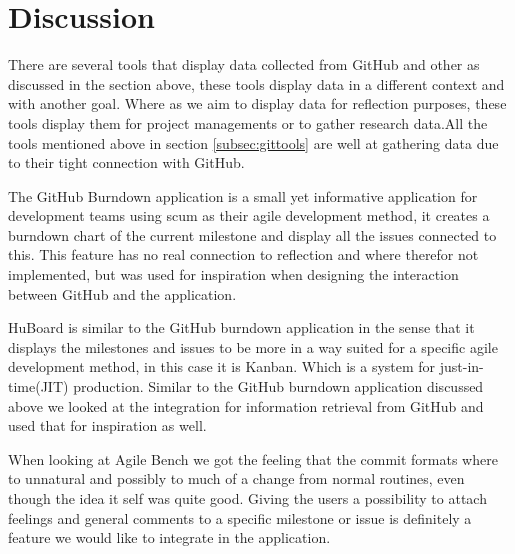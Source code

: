 \section{Discussion}
There are several tools that display data collected from GitHub and other as discussed in the section above, these tools display data in a different context and with another goal. Where as we aim to display data for reflection purposes, these tools display them for project managements or to gather research data.All the tools mentioned above in section \ref{subsec:gittools} are well at gathering data due to their tight connection with GitHub. 

The GitHub Burndown application is a small yet informative application for development teams using scum as their agile development method, it creates a burndown chart of the current milestone and display all the issues connected to this. This feature has no real connection to reflection and where therefor not implemented, but was used for inspiration when designing the interaction between GitHub and the application.

HuBoard is similar to the GitHub burndown application in the sense that it displays the milestones and issues to be more in a way suited for a specific agile development method, in this case it is Kanban. Which is a system for just-in-time(JIT) production. Similar to the GitHub burndown application discussed above we looked at the integration for information retrieval from GitHub and used that for inspiration as well.

When looking at Agile Bench we got the feeling that the commit formats where to unnatural and possibly to much of a change from normal routines, even though the idea it self was quite good. Giving the users a possibility to attach feelings and general comments to a specific milestone or issue is definitely a feature we would like to integrate in the application.